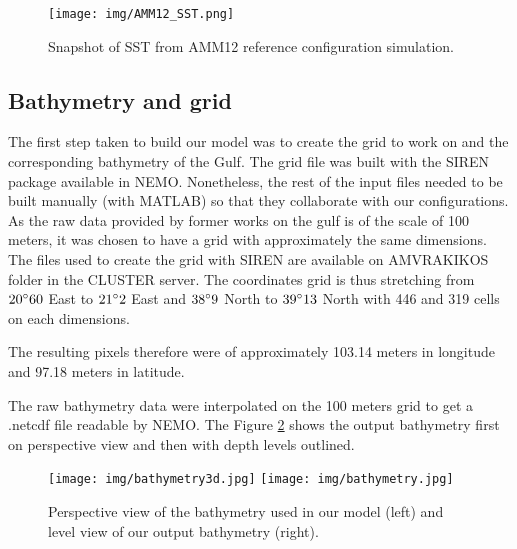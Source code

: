 \documentclass[english]{PFeENSTA}
\begin{document}
{\begin{figure}[!h]
\centering
\texttt{[image: img/AMM12\_SST.png]}
\caption{\label{fig:AMM12_SST}Snapshot of SST from AMM12 reference configuration simulation. }
\end{figure}


\subsection{Bathymetry and grid }

The first step taken to build our model was to create the grid to work on and the corresponding bathymetry of the Gulf.
The grid file was built with the SIREN package available in NEMO. Nonetheless, the rest of the input files needed to be built manually (with MATLAB) so that they collaborate with our configurations.
As the raw data provided by former works on the gulf is of the scale of 100 meters, it was chosen to have a grid with approximately the same dimensions. The files used to create the grid with SIREN are available on AMVRAKIKOS folder in the CLUSTER server. 
The coordinates grid is thus stretching from $20\degree 60$ East to $21\degree 2$ East and $38\degree 9$ North to $39\degree 13$  North with 446 and 319 cells on each dimensions.

The resulting pixels therefore were of approximately 103.14 meters in longitude and 97.18 meters in latitude.

The raw bathymetry data were interpolated on the 100 meters grid to get a .netcdf file readable by NEMO. The Figure \ref{fig:Bathy} shows the output bathymetry first on perspective view and then with depth levels outlined.



\begin{figure}[H]
   \begin{minipage}[h!]{1\linewidth}
      \centering
		\texttt{[image: img/bathymetry3d.jpg]}
		\texttt{[image: img/bathymetry.jpg]}
   \end{minipage} 
   \caption{\label{fig:Bathy}Perspective view of the bathymetry used in our model (left) and  level view of our output bathymetry (right). }


\end{figure}}
\end{document}
